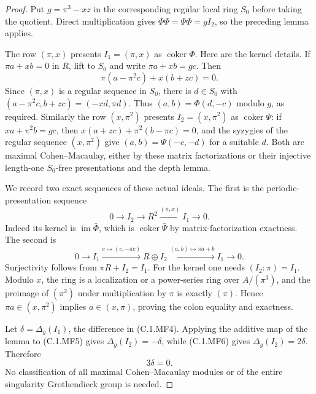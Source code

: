 \begin{proof}
Put $g=\pi^3-xz$ in the corresponding regular local
ring $S_0$ before taking the quotient.
Direct multiplication gives $\Phi\Psi=\Psi\Phi=gI_2$,
so the preceding lemma applies.

The row $(\pi,x)$ presents $I_1=(\pi,x)$ as
$\operatorname{coker}\Phi$.
Here are the kernel details.
If $\pi a+xb=0$ in $R$, lift to $S_0$ and write
$\pi a+xb=gc$.  Then
\[
                 \pi(a-\pi^2c)+x(b+zc)=0.
\]
Since $(\pi,x)$ is a regular sequence in $S_0$,
there is $d\in S_0$ with
$(a-\pi^2c,b+zc)=(-xd,\pi d)$.
Thus $(a,b)=\Phi(d,-c)$ modulo $g$, as required.
Similarly the row $(x,\pi^2)$ presents
$I_2=(x,\pi^2)$ as $\operatorname{coker}\Psi$:
if $xa+\pi^2b=gc$, then
$x(a+zc)+\pi^2(b-\pi c)=0$, and the syzygies
of the regular sequence $(x,\pi^2)$ give
$(a,b)=\Psi(-c,-d)$ for a suitable $d$.
Both are maximal Cohen--Macaulay, either by these
matrix factorizations or their injective length-one
$S_0$-free presentations and the depth lemma.

We record two exact sequences of these actual ideals.
The first is the periodic-presentation sequence
\[
                    0\longrightarrow I_2\longrightarrow R^2
                       \xrightarrow{(\pi,x)}I_1\longrightarrow0.
                                                               \tag{C.1.MF5}
\]
Indeed its kernel is $\operatorname{im}\bar\Phi$,
which is $\operatorname{coker}\bar\Psi$ by
matrix-factorization exactness.
The second is
\[
 0\longrightarrow I_1\xrightarrow{c\mapsto(c,-\pi c)}
 R\oplus I_2\xrightarrow{(a,b)\mapsto\pi a+b}
 I_1\longrightarrow0.                              \tag{C.1.MF6}
\]
Surjectivity follows from $\pi R+I_2=I_1$.
For the kernel one needs $(I_2:\pi)=I_1$.
Modulo $x$, the ring is a localization or a power-series
ring over $A/(\pi^3)$, and the preimage of $(\pi^2)$
under multiplication by $\pi$ is exactly $(\pi)$.
Hence $\pi a\in(x,\pi^2)$ implies $a\in(x,\pi)$,
proving the colon equality and exactness.

Let $\delta=\Delta_g(I_1)$, the difference in
(C.1.MF4).
Applying the additive map of the lemma to (C.1.MF5)
gives $\Delta_g(I_2)=-\delta$, while (C.1.MF6)
gives $\Delta_g(I_2)=2\delta$.
Therefore
\[
                              3\delta=0.              \tag{C.1.MF7}
\]
No classification of all maximal Cohen--Macaulay modules
or of the entire singularity Grothendieck group is needed.


\end{proof}
